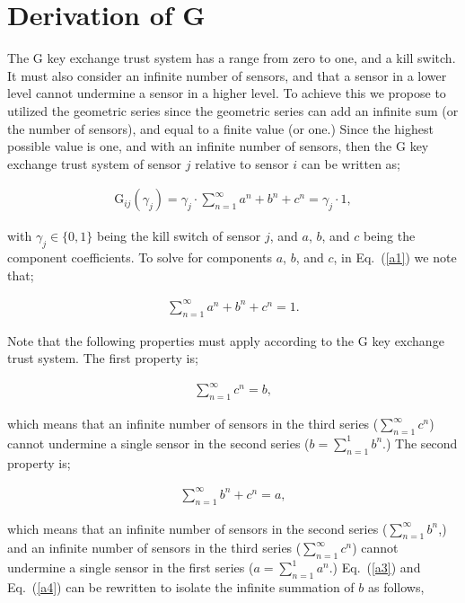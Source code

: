 \documentclass{ws-fnl2}
\begin{document}
\appendix

\section{Derivation of G}
 
 The G key exchange trust system has a range from zero to one, and a kill switch. It must also consider an infinite number of sensors, and that a sensor in a lower level cannot undermine a sensor in a higher level. To achieve this we propose to utilized the geometric series since the geometric series can add an infinite sum (or the number of sensors), and equal to a finite value (or one.) Since the highest possible value is one, and with an infinite number of sensors, then the G key exchange trust system of sensor $j$ relative to sensor $i$ can be written as;
\eject

\noindent
\begin{align}
  \label{a1}
  \mathrm{G}_{ij}(\gamma_j)=\gamma_j \cdot \sum^\infty_{n=1}a^n+b^n+c^n =\gamma_j \cdot 1,
 \end{align}
 


\noindent
with $\gamma_j \in \{0,1\}$ being the kill switch of sensor $j$, and $a$, $b$, and $c$ being the component coefficients. To solve for components $a$, $b$, and $c$, in Eq.~(\ref{a1}) we note that;

\begin{align}
\label{a2}
 \sum^\infty_{n=1}a^n+b^n+c^n =1.
  \end{align}
 


\noindent
Note that the following properties must apply according to the G key exchange trust system. The first property is;

\begin{align}
\label{a3}
 \sum^\infty_{n=1}c^n = b,
  \end{align}
 


\noindent
which means that an infinite number of sensors in the third series ($\sum^\infty_{n=1}c^n$) cannot undermine a single sensor in the second series ($b=\sum^1_{n=1}b^n$.) The second property is;

\begin{align}
\label{a4}
 \sum^\infty_{n=1}b^n + c^n = a,
  \end{align}
 


\noindent
which means that an infinite number of sensors in the second series ($\sum^\infty_{n=1}b^n$,) and an infinite number of sensors in the third series ($\sum^\infty_{n=1}c^n$) cannot undermine a single sensor in the first series ($a=\sum^1_{n=1}a^n$.) Eq.~(\ref{a3}) and Eq.~(\ref{a4}) can be rewritten to isolate the infinite summation of $b$ as follows,
\end{document}
